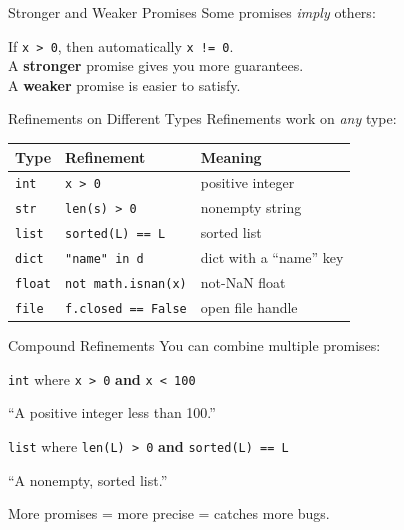 \documentclass[aspectratio=169,10pt]{beamer}
\newcommand{\hint}[1]{\begin{center}
  \colorbox{hintbg}{\parbox{0.88\textwidth}{\centering\small #1}}\end{center}}
\begin{document}
\begin{frame}{Stronger and Weaker Promises}
Some promises \emph{imply} others:
\vspace{0.3em}
\begin{center}
\end{center}
\vspace{0.3em}
If \texttt{x > 0}, then automatically \texttt{x != 0}.\\
A \textbf{stronger} promise gives you more guarantees.\\
A \textbf{weaker} promise is easier to satisfy.
\end{frame}

\begin{frame}[fragile]{Refinements on Different Types}
Refinements work on \emph{any} type:
\vspace{0.2em}

{\small
\begin{tabular}{@{}lll@{}}
\textbf{Type} & \textbf{Refinement} & \textbf{Meaning} \\
\hline
\texttt{int}   & \texttt{x > 0}              & positive integer \\
\texttt{str}   & \texttt{len(s) > 0}         & nonempty string \\
\texttt{list}  & \texttt{sorted(L) == L}     & sorted list \\
\texttt{dict}  & \texttt{"name" in d}        & dict with a ``name'' key \\
\texttt{float} & \texttt{not math.isnan(x)}  & not-NaN float \\
\texttt{file}  & \texttt{f.closed == False}  & open file handle \\
\end{tabular}}
\end{frame}

\begin{frame}{Compound Refinements}
You can combine multiple promises:
\vspace{0.5em}
\begin{center}
\texttt{int} where \texttt{x > 0} \textbf{and} \texttt{x < 100}
\end{center}
\vspace{0.3em}
``A positive integer less than 100.''
\vspace{0.5em}

\begin{center}
\texttt{list} where \texttt{len(L) > 0} \textbf{and} \texttt{sorted(L) == L}
\end{center}
\vspace{0.3em}
``A nonempty, sorted list.''
\hint{More promises = more precise = catches more bugs.}
\end{frame}
\end{document}
